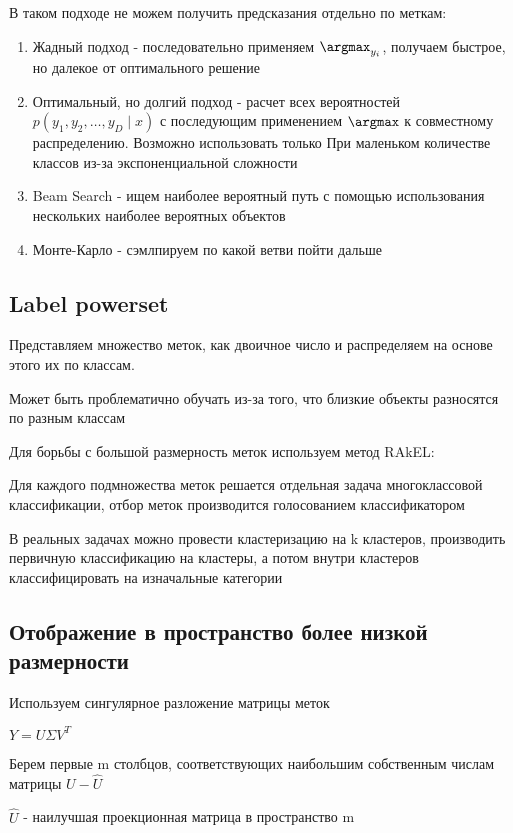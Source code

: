 \documentclass[a4paper, 12pt]{article}
\begin{document}
В таком подходе не можем получить предсказания отдельно по меткам:

\begin{enumerate}
    \item Жадный подход - последовательно применяем $\argmax_{y_i}$,
    получаем быстрое, но далекое от оптимального решение
    \item Оптимальный, но долгий подход - расчет всех вероятностей
    $p(y_1, y_2, \dots, y_D \mid x)$ с последующим применением $\argmax$
    к совместному распределению. Возможно использовать только При
    маленьком количестве классов из-за экспоненциальной сложности
    \item Beam Search - ищем наиболее вероятный путь с помощью
    использования нескольких наиболее вероятных объектов
    \item Монте-Карло - сэмлпируем по какой ветви пойти дальше
\end{enumerate}

\subsection{Label powerset}

Представляем множество меток, как двоичное число и 
распределяем на основе этого их по классам.

Может быть проблематично обучать из-за того, 
что близкие объекты разносятся по разным классам

Для борьбы с большой размерность меток используем метод RAkEL:

Для каждого подмножества меток решается 
отдельная задача многоклассовой классификации,
отбор меток производится голосованием классификатором

В реальных задачах можно провести кластеризацию на k кластеров,
производить первичную классификацию на кластеры,
а потом внутри кластеров классифицировать на 
изначальные категории

\subsection{Отображение в пространство более низкой размерности}

Используем сингулярное разложение матрицы меток

$Y = U \Sigma V^T$

Берем первые m столбцов, соответствующих наибольшим
собственным числам матрицы $U - \hat{U}$

$\hat{U}$ - наилучшая проекционная матрица в пространство m
\end{document}
